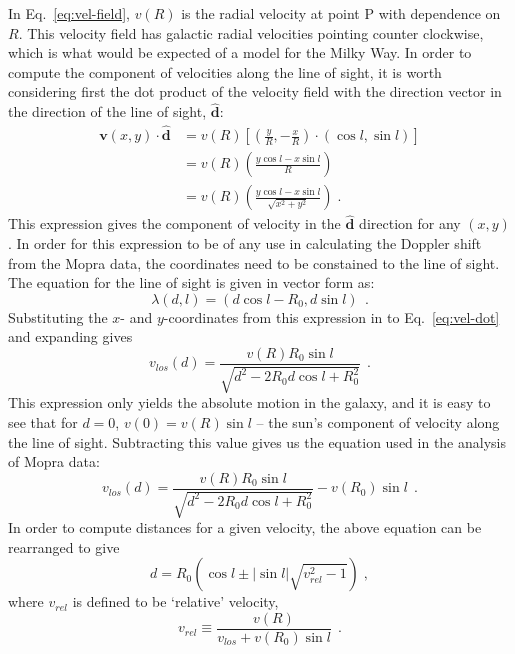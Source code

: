 \documentclass[a4paper, titlepage, oneside]{article}
\begin{document}
In Eq.~\eqref{eq:vel-field}, \(v(R)\) is the radial velocity at point P with dependence on \(R\). This velocity field has galactic radial velocities pointing counter clockwise, which is what would be expected of a model for the Milky Way. In order to compute the component of velocities along the line of sight, it is worth considering first the dot product of the velocity field with the direction vector in the direction of the line of sight, \(\mathbf{\hat{d}}\):
\begin{align}
  \mathbf{v}(x,y)\cdot\mathbf{\hat{d}}&=v(R)\left[\left(\frac{y}{R},-\frac{x}{R}\right)\!\cdot(\cos{l},\sin{l})\right] \\
  &=v(R)\left(\frac{y\cos{l}-x\sin{l}}{R}\right) \\
  &=v(R)\left(\frac{y\cos{l}-x\sin{l}}{\sqrt{x^2+y^2}}\right)\;.
  \label{eq:vel-dot}
\end{align}
This expression gives the component of velocity in the \(\mathbf{\hat{d}}\) direction for any \((x,y)\). In order for this expression to be of any use in calculating the Doppler shift from the Mopra data, the coordinates need to be constained to the line of sight. The equation for the line of sight is given in vector form as:
\begin{equation}
  \lambda(d,l)=(d\cos{l}-R_0,d\sin{l})\;\,.
\end{equation}
Substituting the \(x\)- and \(y\)-coordinates from this expression in to Eq.~\eqref{eq:vel-dot} and expanding gives
\begin{equation}
  v_{los}(d)=\frac{v(R)R_0\sin{l}}{\sqrt{d^2-2R_0d\cos{l}+R_0^2}}\;\,.
\end{equation}
This expression only yields the absolute motion in the galaxy, and it is easy to see that for \(d=0\), \(v(0)=v(R)\sin{l}\) -- the sun's component of velocity along the line of sight. Subtracting this value gives us the equation used in the analysis of Mopra data:
\begin{equation}
  v_{los}(d)=\frac{v(R)R_0\sin{l}}{\sqrt{d^2-2R_0d\cos{l}+R_0^2}}-v(R_0)\sin{l}\;\,.
\end{equation}
In order to compute distances for a given velocity, the above equation can be rearranged to give
\begin{equation}
  d=R_0\left(\cos{l}\pm|\sin{l}|\sqrt{v_{rel}^2-1}\right)\;,
  \label{eq:d}
\end{equation}
where \(v_{rel}\) is defined to be `relative' velocity,
\begin{equation}
  v_{rel}\equiv\frac{v(R)}{v_{los}+v(R_0)\sin{l}}\;\,.
\end{equation}
\end{document}

